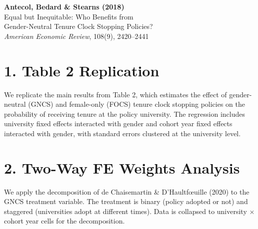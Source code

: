 \documentclass[12pt]{article}
\begin{document}
\begin{center}
{\Large\bfseries Antecol, Bedard \& Stearns (2018)}\\
{\large Equal but Inequitable: Who Benefits from}\\
{\large Gender-Neutral Tenure Clock Stopping Policies?}\\
\vspace{0.5em}
{\normalsize \textit{American Economic Review}, 108(9), 2420--2441}
\end{center}

\vspace{1em}

\section*{1. Table 2 Replication}

We replicate the main results from Table 2, which estimates the effect 
of gender-neutral (GNCS) and female-only (FOCS) tenure clock stopping 
policies on the probability of receiving tenure at the policy university. 
The regression includes university fixed effects interacted with gender 
and cohort year fixed effects interacted with gender, with standard errors 
clustered at the university level.



\clearpage

\section*{2. Two-Way FE Weights Analysis}

We apply the decomposition of de Chaisemartin \& D'Haultf\oe uille (2020) 
to the GNCS treatment variable. The treatment is binary (policy adopted or not) 
and staggered (universities adopt at different times). 
Data is collapsed to university $\times$ cohort year cells for the decomposition.


\end{document}
